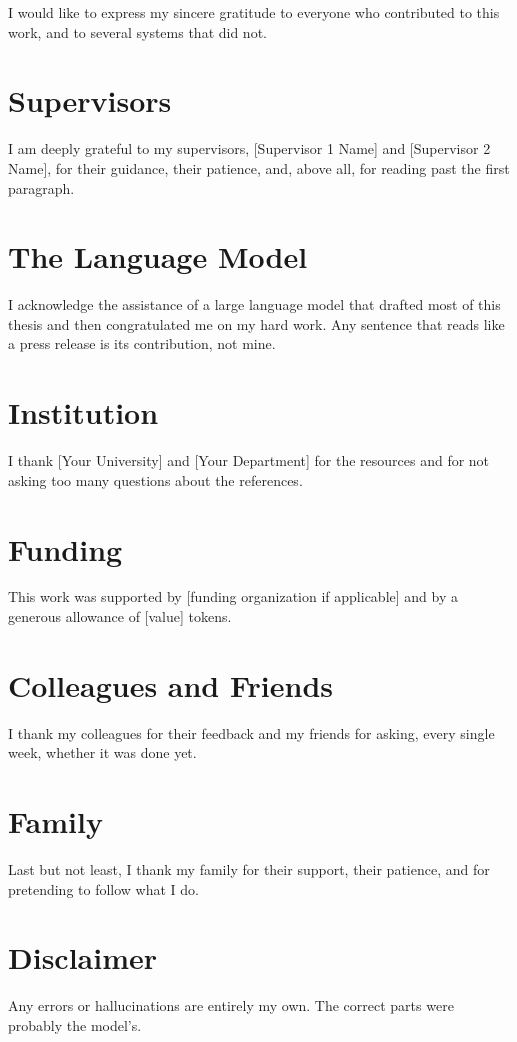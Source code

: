 
I would like to express my sincere gratitude to everyone who
contributed to this work, and to several systems that did not.

\section*{Supervisors}

I am deeply grateful to my supervisors, [Supervisor 1 Name] and
[Supervisor 2 Name], for their guidance, their patience, and, above
all, for reading past the first paragraph.

\section*{The Language Model}

I acknowledge the assistance of a large language model that drafted
most of this thesis and then congratulated me on my hard work. Any
sentence that reads like a press release is its contribution, not mine.

\section*{Institution}

I thank [Your University] and [Your Department] for the resources and
for not asking too many questions about the references.

\section*{Funding}

This work was supported by [funding organization if applicable] and by
a generous allowance of [value] tokens.

\section*{Colleagues and Friends}

I thank my colleagues for their feedback and my friends for asking,
every single week, whether it was done yet.

\section*{Family}

Last but not least, I thank my family for their support, their
patience, and for pretending to follow what I do.

\section*{Disclaimer}

Any errors or hallucinations are entirely my own. The correct parts
were probably the model's.
